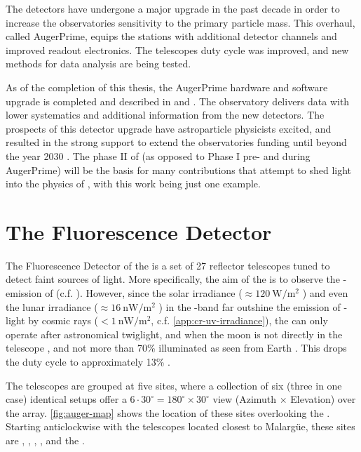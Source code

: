 The detectors have undergone a major upgrade in the past decade in order to 
increase the observatories sensitivity to the primary particle mass. This 
overhaul, called AugerPrime, equips the \SD stations with additional detector 
channels and improved readout electronics. The \FD telescopes duty cycle was 
improved, and new methods for data analysis are being tested.

As of the completion of this thesis, the AugerPrime hardware and software 
upgrade is completed and described in  and 
\cite{collaborationPierreAugerObservatory2011}. The observatory delivers data 
with lower systematics and additional information from the new detectors. The 
prospects of this detector upgrade have astroparticle physicists excited, and 
resulted in the strong support to extend the observatories funding until beyond
the year 2030 \cite{castellinaOutcomeFinanceBoard2023}. The phase II of \DAQ (as
opposed to Phase I pre- and during AugerPrime) will be the basis for many 
contributions that attempt to shed light into the physics of \UHECRs, with this 
work being just one example.

\section{The Fluorescence Detector}
\label{sec:fd}

The Fluorescence Detector of the \PAO is a set of 27 reflector telescopes tuned
to detect faint sources of \UV light. More specifically, the aim of the \FD is
to observe the \UV-emission of \EAS (c.f. ). However, 
since the solar irradiance ($\approx\SI{120}{\watt\per\meter\squared}$ 
\cite{leanContributionUltravioletIrradiance1989}) and even the lunar irradiance 
($\approx\SI{16}{\nano\watt\per\meter\squared}$
\cite{snowAbsoluteUltravioletIrradiance2013}) in the \UV-band far outshine the 
emission of \UV-light by cosmic rays ($<\SI{1}{\nano\watt\per\meter\squared}$, 
c.f. \cref{app:cr-uv-irradiance}), the \FD can only operate after astronomical 
twiglight, and when the moon is not directly in the telescope \FOV, and not
more than 70\% illuminated as seen from Earth \cite{mathesCriteriaFDShift}. This
drops the duty cycle to approximately 13\% 
\cite{abrahamFluorescenceDetectorPierre2010}.

The telescopes are grouped at five \FD sites, where a collection of six (three
in one case) identical setups offer a $6\cdot30^\circ=180^\circ\times30^\circ$ 
view (Azimuth $\times$ Elevation) over the \SD array. \cref{fig:auger-map} shows
the location of these sites overlooking the \SD. Starting anticlockwise with the
telescopes located closest to Malargüe, these sites are \LL, \LM, \LA, \CO, and 
the \HE.

